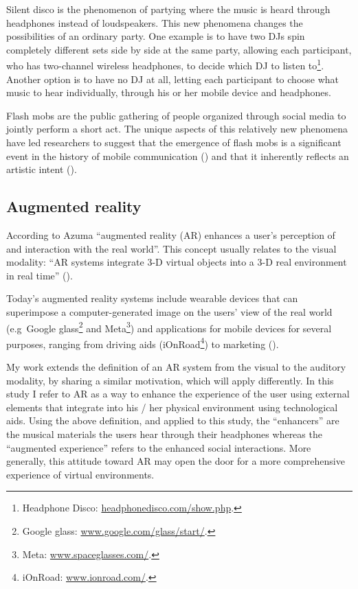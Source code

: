 \documentclass[a4paper,11pt]{article}
\begin{document}
Silent disco is the phenomenon of partying where the music is heard through headphones instead of loudspeakers.
This new phenomena changes the possibilities of an ordinary party.
One example is to have two DJs spin completely different sets side by side at the same party, allowing each participant, who has two-channel wireless headphones, to decide which DJ to listen to\footnote{Headphone Disco: \href{http://headphonedisco.com/show.php}{headphonedisco.com/show.php}.}.
Another option is to have no DJ at all, letting each participant to choose what music to hear individually, through his or her mobile device and headphones.

Flash mobs are the public gathering of people organized through social media to jointly perform a short act.
The unique aspects of this relatively new phenomena have led researchers to suggest that the emergence of flash mobs is a significant event in the history of mobile communication (\cite{nicholson05}) and that it inherently reflects an artistic intent (\cite{brejzek10}).

\subsection{Augmented reality} \label{literature:ar}

According to Azuma ``augmented reality (AR) enhances a user's perception of and interaction with the real world''.
This concept usually relates to the visual modality: ``AR systems integrate 3-D virtual objects into a 3-D real environment in real time'' (\cite{azuma97}).

Today's augmented reality systems include wearable devices that can superimpose a computer-generated image on the users' view of the real world (e.g\ Google glass\footnote{Google glass: \href{http://www.google.com/glass/start/}{www.google.com/glass/start/}.} and Meta\footnote{Meta: \href{https://www.spaceglasses.com/}{www.spaceglasses.com/}.}) and applications for mobile devices for several purposes, ranging from driving aids (iOnRoad\footnote{iOnRoad: \href{http://www.ionroad.com/}{www.ionroad.com/}.}) to marketing (\cite{ikea}).

My work extends the definition of an AR system from the visual to the auditory modality, by sharing a similar motivation, which will apply differently.
In this study I refer to AR as a way to enhance the experience of the user using external elements that integrate into his / her physical environment using technological aids.
Using the above definition, and applied to this study, the ``enhancers'' are the musical materials the users hear through their headphones whereas the ``augmented experience'' refers to the enhanced social interactions.
More generally, this attitude toward AR may open the door for a more comprehensive experience of virtual environments.
\end{document}
